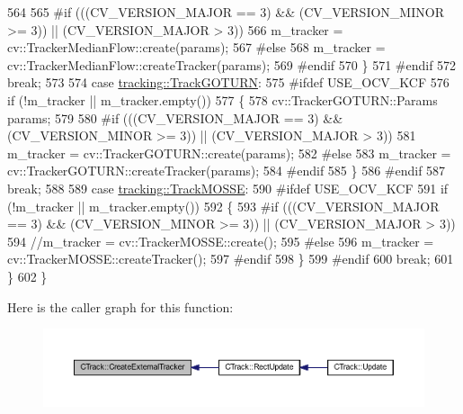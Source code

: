 \begin{DoxyCode}
564 
565 \textcolor{preprocessor}{#if (((CV\_VERSION\_MAJOR == 3) && (CV\_VERSION\_MINOR >= 3)) || (CV\_VERSION\_MAJOR > 3))}
566             m\_tracker = cv::TrackerMedianFlow::create(params);
567 \textcolor{preprocessor}{#else}
568             m\_tracker = cv::TrackerMedianFlow::createTracker(params);
569 \textcolor{preprocessor}{#endif}
570         \}
571 \textcolor{preprocessor}{#endif}
572         \textcolor{keywordflow}{break};
573 
574     \textcolor{keywordflow}{case} \mbox{\hyperlink{namespacetracking_a5377d69122ad915004ef68a518d22be3a674ec8effe560545c87b0c14bd40f7f3}{tracking::TrackGOTURN}}:
575 \textcolor{preprocessor}{#ifdef USE\_OCV\_KCF}
576         \textcolor{keywordflow}{if} (!m\_tracker || m\_tracker.empty())
577         \{
578             cv::TrackerGOTURN::Params params;
579 
580 \textcolor{preprocessor}{#if (((CV\_VERSION\_MAJOR == 3) && (CV\_VERSION\_MINOR >= 3)) || (CV\_VERSION\_MAJOR > 3))}
581             m\_tracker = cv::TrackerGOTURN::create(params);
582 \textcolor{preprocessor}{#else}
583             m\_tracker = cv::TrackerGOTURN::createTracker(params);
584 \textcolor{preprocessor}{#endif}
585         \}
586 \textcolor{preprocessor}{#endif}
587         \textcolor{keywordflow}{break};
588 
589     \textcolor{keywordflow}{case} \mbox{\hyperlink{namespacetracking_a5377d69122ad915004ef68a518d22be3aa3948447c2ea9d8e9efef9b9433c70e2}{tracking::TrackMOSSE}}:
590 \textcolor{preprocessor}{#ifdef USE\_OCV\_KCF}
591         \textcolor{keywordflow}{if} (!m\_tracker || m\_tracker.empty())
592         \{
593 \textcolor{preprocessor}{#if (((CV\_VERSION\_MAJOR == 3) && (CV\_VERSION\_MINOR >= 3)) || (CV\_VERSION\_MAJOR > 3))}
594             \textcolor{comment}{//m\_tracker = cv::TrackerMOSSE::create();}
595 \textcolor{preprocessor}{#else}
596             m\_tracker = cv::TrackerMOSSE::createTracker();
597 \textcolor{preprocessor}{#endif}
598         \}
599 \textcolor{preprocessor}{#endif}
600         \textcolor{keywordflow}{break};
601     \}
602 \}
\end{DoxyCode}
Here is the caller graph for this function\+:\nopagebreak
\begin{figure}[H]
\begin{center}
\leavevmode
\includegraphics[width=350pt]{class_c_track_ab7ffab3c66234eeb542d0411abfa24e6_icgraph}
\end{center}
\end{figure}
\mbox{\label{class_c_track_abe6c22779a5d7f0403980f4b4c647ade}} 
